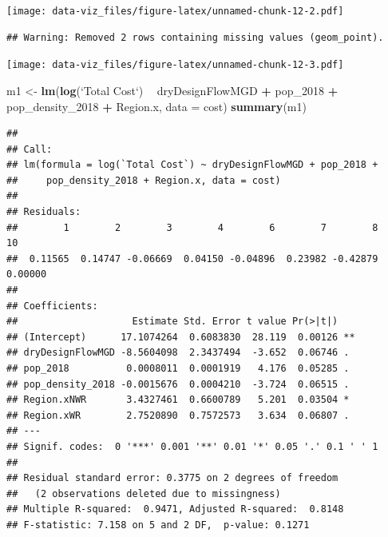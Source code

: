 \documentclass[
]{article}
\newenvironment{Shaded}{\begin{snugshade}}{\end{snugshade}}
\newcommand{\DataTypeTok}[1]{\textcolor[rgb]{0.13,0.29,0.53}{#1}}
\newcommand{\DecValTok}[1]{\textcolor[rgb]{0.00,0.00,0.81}{#1}}
\newcommand{\KeywordTok}[1]{\textcolor[rgb]{0.13,0.29,0.53}{\textbf{#1}}}
\newcommand{\NormalTok}[1]{#1}
\newcommand{\OperatorTok}[1]{\textcolor[rgb]{0.81,0.36,0.00}{\textbf{#1}}}
\newcommand{\StringTok}[1]{\textcolor[rgb]{0.31,0.60,0.02}{#1}}
\begin{document}
\texttt{[image: data-viz\_files/figure-latex/unnamed-chunk-12-2.pdf]}

\begin{Shaded}
\end{Shaded}

\begin{verbatim}
## Warning: Removed 2 rows containing missing values (geom_point).
\end{verbatim}

\texttt{[image: data-viz\_files/figure-latex/unnamed-chunk-12-3.pdf]}

\begin{Shaded}
\begin{Highlighting}[]
\NormalTok{m1 <-}\StringTok{ }\KeywordTok{lm}\NormalTok{(}\KeywordTok{log}\NormalTok{(}\StringTok{`}\DataTypeTok{Total Cost}\StringTok{`}\NormalTok{) }\OperatorTok{~}\StringTok{ }\NormalTok{dryDesignFlowMGD }\OperatorTok{+}\StringTok{ }\NormalTok{pop_}\DecValTok{2018} \OperatorTok{+}\StringTok{ }\NormalTok{pop_density_}\DecValTok{2018} \OperatorTok{+}\StringTok{ }\NormalTok{Region.x, }\DataTypeTok{data =}\NormalTok{ cost)}
\KeywordTok{summary}\NormalTok{(m1)}
\end{Highlighting}
\end{Shaded}

\begin{verbatim}
## 
## Call:
## lm(formula = log(`Total Cost`) ~ dryDesignFlowMGD + pop_2018 + 
##     pop_density_2018 + Region.x, data = cost)
## 
## Residuals:
##        1        2        3        4        6        7        8       10 
##  0.11565  0.14747 -0.06669  0.04150 -0.04896  0.23982 -0.42879  0.00000 
## 
## Coefficients:
##                    Estimate Std. Error t value Pr(>|t|)   
## (Intercept)      17.1074264  0.6083830  28.119  0.00126 **
## dryDesignFlowMGD -8.5604098  2.3437494  -3.652  0.06746 . 
## pop_2018          0.0008011  0.0001919   4.176  0.05285 . 
## pop_density_2018 -0.0015676  0.0004210  -3.724  0.06515 . 
## Region.xNWR       3.4327461  0.6600789   5.201  0.03504 * 
## Region.xWR        2.7520890  0.7572573   3.634  0.06807 . 
## ---
## Signif. codes:  0 '***' 0.001 '**' 0.01 '*' 0.05 '.' 0.1 ' ' 1
## 
## Residual standard error: 0.3775 on 2 degrees of freedom
##   (2 observations deleted due to missingness)
## Multiple R-squared:  0.9471, Adjusted R-squared:  0.8148 
## F-statistic: 7.158 on 5 and 2 DF,  p-value: 0.1271
\end{verbatim}
\end{document}
